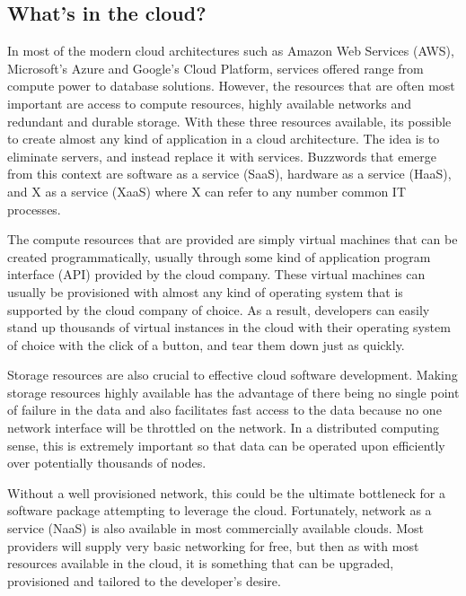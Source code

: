 \subsection{\label{subsection:in_the_cloud}What's in the cloud?}
In most of the modern cloud architectures such as Amazon Web Services (AWS),
Microsoft's Azure and Google's Cloud Platform, services offered range from
compute power to database solutions. However, the resources that are often
most important are access to compute resources, highly available networks and
redundant and durable storage. With these three resources available, its possible
to create almost any kind of application in a cloud architecture. The idea is
to eliminate servers, and instead replace it with services. Buzzwords
that emerge from this context are software as a service (SaaS), hardware as a service
(HaaS), and X as a service (XaaS) where X can refer to any number common IT
processes.

The compute resources that are provided are simply virtual machines that can be
created programmatically, usually through some kind of application program
interface (API) provided by the cloud company. These virtual machines can
usually be provisioned with almost any kind of operating system that is
supported by the cloud company of choice. As a result, developers can easily
stand up thousands of virtual instances in the cloud with their operating system
of choice with the click of a button, and tear them down just as quickly.

Storage resources are also crucial to effective cloud software development.
Making storage resources highly available has the advantage of there being
no single point of failure in the data and also facilitates fast access to the
data because no one network interface will be throttled on the network. In a
distributed computing sense, this is extremely important so that data can be operated
upon efficiently over potentially thousands of nodes.

Without a well provisioned network, this could be the ultimate bottleneck for
a software package attempting to leverage the cloud. Fortunately, network as a
service (NaaS) is also available in most commercially available clouds. Most
providers will supply very basic networking for free, but then as with most
resources available in the cloud, it is something that can be upgraded, provisioned
and tailored to the developer's desire.

